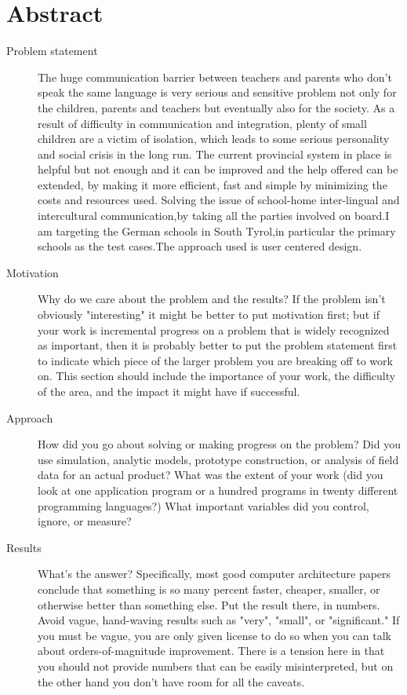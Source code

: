 \chapter*{Abstract}

\begin{description}

  \item[Problem statement] The huge communication barrier between
  teachers and parents who don't speak the same language is very serious
  and sensitive problem not only for the children, parents and teachers 
  but eventually also for the society. 
  As a result of difficulty in communication and integration, plenty of
  small children are a victim of isolation, which leads to some serious 
  personality and social crisis in the long run. 
  The current provincial system in place is helpful but not enough and 
  it can be improved and the help offered can be extended, by making it
  more efficient, fast and simple by minimizing the costs and resources 
  used. 
  Solving the issue of school-home inter-lingual and intercultural
  communication,by taking all the parties involved on board.I am targeting
  the German schools in South Tyrol,in particular the primary schools as the
  test cases.The approach used is user centered design.

  \item[Motivation] Why do we care about the problem and the results?
  If the problem isn't obviously "interesting" it might be better to put
  motivation first; but if your work is incremental progress on a problem that
  is widely recognized as important, then it is probably better to put the
  problem statement first to indicate which piece of the larger problem you are
  breaking off to work on. This section should include the importance of your
  work, the difficulty of the area, and the impact it might have if successful.

  \item[Approach] How did you go about solving or making progress on
  the problem? Did you use simulation, analytic models, prototype construction,
  or analysis of field data for an actual product? What was the extent of your
  work (did you look at one application program or a hundred programs in twenty
  different programming languages?) What important variables did you control,
  ignore, or measure?

  \item[Results] What's the answer? Specifically, most good computer
  architecture papers conclude that something is so many percent faster,
  cheaper, smaller, or otherwise better than something else. Put the result
  there, in numbers. Avoid vague, hand-waving results such as "very", "small",
  or "significant." If you must be vague, you are only given license to do so
  when you can talk about orders-of-magnitude improvement. There is a tension
  here in that you should not provide numbers that can be easily misinterpreted,
  but on the other hand you don't have room for all the caveats.


\end{description}
